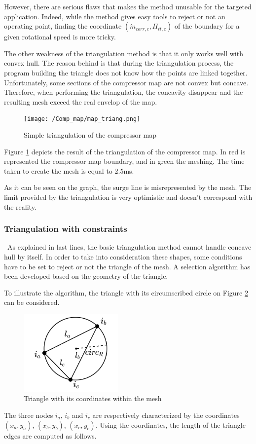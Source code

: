However, there are serious flaws that makes the method unusable for the targeted application. Indeed, while the method gives easy tools to reject or not an operating point, finding the coordinate $(\dot{m}_{corr,c},\Pi_{tt,c})$ of the boundary for a given rotational speed is more tricky. 

The other weakness of the triangulation method is that it only works well with convex hull. The reason behind is that during the triangulation process, the program building the triangle does not know how the points are linked together. Unfortunately, some sections of the compressor map are not convex but concave. Therefore, when performing the triangulation, the concavity disappear and the resulting mesh exceed the real envelop of the map.

\begin{figure}[h]
    \centering
    \texttt{[image: /Comp\_map/map\_triang.png]}
    \caption{Simple triangulation of the compressor map}
    \label{fig:C7_trimap}
\end{figure}
Figure \ref{fig:C7_trimap} depicts the result of the triangulation of the compressor map. In red is represented the compressor map boundary, and in green the meshing. The time taken to create the mesh is equal to 2.5ms.

As it can be seen on the graph, the surge line is misrepresented by the mesh. The limit provided by the triangulation is very optimistic and doesn't correspond with the reality. 

\subsubsection{Triangulation with constraints}
\quad\ As explained in last lines, the basic triangulation method cannot handle concave hull by itself. In order to take into consideration these shapes, some conditions have to be set to reject or not the triangle of the mesh. A selection algorithm  has been developed \cite{} based on the geometry of the triangle.

To illustrate the algorithm, the triangle with its circumscribed circle on Figure \ref{fig:C7_triangmesh} can be considered.

\begin{figure}[h]
    \centering
    \includegraphics[width=0.45\textwidth]{Comp_map/triang_mesh.png}
    \caption{Triangle with its coordinates within the mesh}
    \label{fig:C7_triangmesh}
\end{figure}
The three nodes $i_a$, $i_b$ and $i_c$ are respectively characterized by the coordinates $(x_a,y_a)$, $(x_b,y_b)$, $(x_c,y_c)$. Using the coordinates, the length of the triangle edges are computed as follows.

